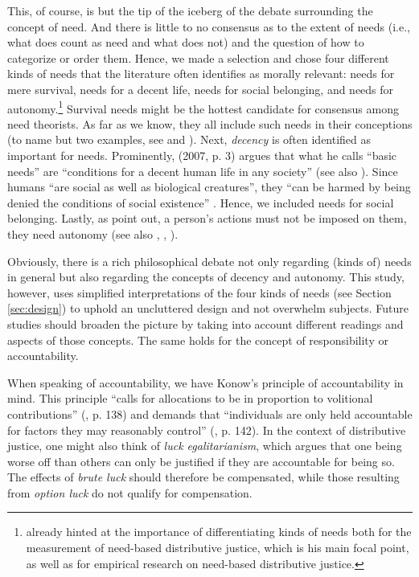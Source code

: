 \documentclass[egregdoesnotlikesansseriftitles]{scrartcl}
\begin{document}
This, of course, is but the tip of the iceberg of the debate surrounding the concept of need.
And there is little to no consensus as to the extent of needs (i.e., what does count as need and what does not) and the question of how to categorize or order them.
Hence, we made a selection and chose four different kinds of needs that the literature often identifies as morally relevant: needs for mere survival, needs for a decent life, needs for social belonging, and needs for autonomy.\footnote{\cite{bauer_sated_2018,bauer_sated_2022} already hinted at the importance of differentiating kinds of needs both for the measurement of need-based distributive justice, which is his main focal point, as well as for empirical research on need-based distributive justice.}
Survival needs might be the hottest candidate for consensus among need theorists.
As far as we know, they all include such needs in their conceptions (to name but two examples, see \citealt{wiggins_needs_1987} and \citealt{daniels_just_1985}).
Next, \textit{decency} is often identified as important for needs.
Prominently, \citeauthor{miller_human_2007} (2007, p. 3) argues that what he calls ``basic needs'' are ``conditions for a decent human life in any society'' (see also \citealt{miller_principles_1999}).
Since humans ``are social as well as biological creatures'', they ``can be harmed by being denied the conditions of social existence'' \cite[p. 3]{miller_human_2007}.
Hence, we included needs for social belonging.
Lastly, as \citet{doyal_theory_1984,doyal_theory_1991} point out, a person's actions must not be imposed on them, they need autonomy (see also \citealt{hamilton_political_2003}, \citealt{brock_needs_2005}, \citealt{siebel_need-based_2020}).

Obviously, there is a rich philosophical debate not only regarding (kinds of) needs in general but also regarding the concepts of decency and autonomy.
This study, however, uses simplified interpretations of the four kinds of needs (see Section \ref{sec:design}) to uphold an uncluttered design and not overwhelm subjects.
Future studies should broaden the picture by taking into account different readings and aspects of those concepts.
The same holds for the concept of responsibility or accountability.

When speaking of accountability, we have Konow's principle of accountability in mind.
This principle ``calls for allocations to be in proportion to volitional contributions'' (\citealt{konow_fair_2001}, p. 138) and demands that ``individuals are only held accountable for factors they may reasonably control'' (\citealt{konow_fair_2001}, p. 142).
In the context of distributive justice, one might also think of \textit{luck egalitarianism}, which argues that one being worse off than others can only be justified if they are accountable for being so.
The effects of \textit{brute luck} should therefore be compensated, while those resulting from \textit{option luck} do not qualify for compensation.
\end{document}
